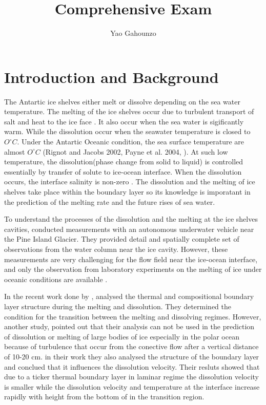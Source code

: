 \documentclass[11pt,a4paper]{article}
\title{Comprehensive Exam\\[1ex] }
\author{Yao Gahounzo}
\begin{document}
	
	\maketitle
	
	\section{Introduction and  Background}
	
	The Antartic ice shelves either melt or dissolve depending on the sea water temperature. The melting of the ice shelves occur due to turbulent transport of salt and heat to the ice face \cite{gayen2016simulation}. It also occur when the sea water is sigificantly warm. While the dissolution occur when the seawater temperature is closed to $O^{\circ} C$. Under the Antartic Oceanic condition, the sea surface temperature are almost $O^{\circ} C$ (Rignot and Jacobs 2002, Payne et al. 2004,  \cite{gayen2016simulation}). At such low temperature, the dissolution(phase change from solid to liquid) is controlled essentially by transfer of solute to ice-ocean interface. When the dissolution occurs, the interface salinity is non-zero \cite{kerr2015dissolution}. The dissolution and the melting of ice shelves take place within the boundary layer so its knowledge is imporatant in the prediction of the melting rate and the future rises of sea water.
	
	To understand the processes of the dissolution and the melting at the ice shelves cavities, \cite{jenkins2010observations} conducted  measurements with an autonomous underwater vehicle near the Pine Island Glacier. They provided detail and spatially complete set of observations from the water column near the ice cavity. However, these measurements are very challenging for the flow field near the ice-ocean interface, and only the observation from laboratory experiments on the melting of ice under oceanic conditions are available \cite{gayen2016simulation}.
	
	In the recent work done by \cite{wells2011melting}, analysed the thermal and compositional boundary layer structure during the melting and dissolution. They determined the condition for the transition between the melting and dissolving regimes. However, another study, pointed out that their analysis can not be used in the prediction of dissolution or melting of large bodies of ice especially in the polar ocean because of turbulence that occur from the conective flow after a vertical distance of 10-20 cm. \cite{gayen2016simulation} in their work 
	 they also analysed the structure of the boundary layer and conclued that it influences the dissolution velocity. Their resluts showed that due to  a ticker thermal boundary layer in laminar regime the dissolution velocity is smaller while the dissolution velocity and temperature at the interface increase rapidly with height from the bottom of in the transition region.
	 
\end{document}
